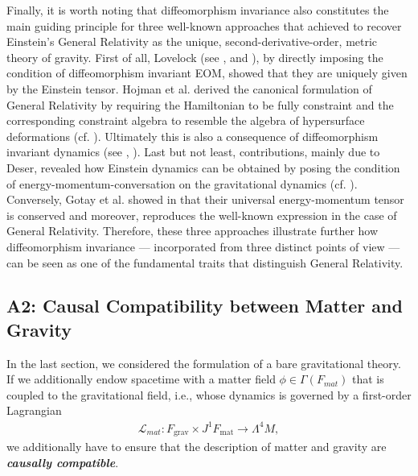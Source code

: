 \documentclass[%
 reprint,
nofootinbib,
 amsmath,amssymb,
 aps,
 prd,
floatfix,
]{revtex4-2}
\begin{document}
Finally, it is worth noting that diffeomorphism invariance also constitutes the main guiding principle for three well-known approaches that achieved to recover Einstein's General Relativity as the unique, second-derivative-order, metric theory of gravity. 
First of all, Lovelock (see \cite{Lovelock1969}, \cite{doi:10.1063/1.1665613} and \cite{doi:10.1063/1.1666069}), by directly imposing the condition of diffeomorphism invariant EOM, showed that they are uniquely given by the Einstein tensor.
Hojman et al. derived the canonical formulation of General Relativity by requiring the Hamiltonian to be fully constraint and the corresponding constraint algebra to resemble the algebra of hypersurface deformations (cf. \cite{HOJMAN197688}).
Ultimately this is also a consequence of diffeomorphism invariant dynamics (see \cite{TobiMaster}, \cite{bojowald_2010}).
Last but not least, contributions, mainly due to Deser, revealed how Einstein dynamics can be obtained by posing the condition of energy-momentum-conversation on the gravitational dynamics (cf. \cite{1970GReGr...1....9D}).
Conversely, Gotay et al. showed in \cite{Gotay1992StressEnergyMomentumTA} that their universal energy-momentum tensor is conserved and moreover, reproduces the well-known expression in the case of General Relativity.
Therefore, these three approaches illustrate further how diffeomorphism invariance --- incorporated from three distinct points of view --- can be seen as one of the fundamental traits that distinguish General Relativity.

\subsection{A2: Causal Compatibility between Matter and Gravity}

In the last section, we considered the formulation of a bare gravitational theory. If we additionally endow spacetime with a matter field $\phi \in  \Gamma(F_{mat})$ that is coupled to the gravitational field, i.e., whose dynamics is governed by a first-order Lagrangian
\begin{align}\label{matterL}
    \mathcal{L}_{mat} : F_\text{grav} \times J^1F_\text{mat} \longrightarrow \Lambda^4M,
\end{align}
we additionally have to ensure that the description of matter and gravity are \textit{\textbf{causally compatible}}.
\end{document}
